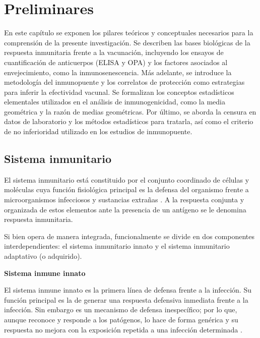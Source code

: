 \chapter{Preliminares}\label{chapter:state-of-the-art}

En este capítulo se exponen los pilares teóricos y conceptuales necesarios para la comprensión de la presente investigación. Se describen las bases biológicas de la respuesta inmunitaria frente a la vacunación, incluyendo los ensayos de cuantificación de anticuerpos (ELISA y OPA) y los factores asociados al envejecimiento, como la inmunosenescencia. Más adelante, se introduce la metodología del inmunopuente y los correlatos de protección como estrategias para inferir la efectividad vacunal. Se formalizan los conceptos estadísticos elementales utilizados en el análisis de inmunogenicidad, como la media geométrica y la razón de medias geométricas. Por último, se aborda la censura en datos de laboratorio y los métodos estadísticos para tratarla, así como el criterio de no inferioridad utilizado en los estudios de inmunopuente.

\section{Sistema inmunitario}

El sistema inmunitario está constituido por el conjunto coordinado de células y moléculas cuya función fisiológica principal es la defensa del organismo frente a microorganismos infecciosos y sustancias extrañas \cite{abbas2015}. A la respuesta conjunta y organizada de estos elementos ante la presencia de un antígeno se le denomina respuesta inmunitaria.

Si bien opera de manera integrada, funcionalmente se divide en dos componentes interdependientes: el sistema inmunitario innato y el sistema inmunitario adaptativo (o adquirido).

\vspace{\baselineskip}
\textbf{Sistema inmune innato}
\vspace{\baselineskip}

El sistema inmune innato es la primera línea de defensa frente a la infección. Su función principal es la de generar una respuesta defensiva inmediata frente a la infección. Sin embargo es un mecanismo de defensa inespecífico; por lo que, aunque reconoce y responde a los patógenos, lo hace de forma genérica y su respuesta no mejora con la exposición repetida a una infección determinada \cite{aep2026}.

